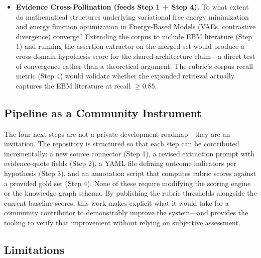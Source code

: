 \documentclass[
  english,
]{article}
\begin{document}
\begin{itemize}
  low-dimensional discrete environments). Beyond what state-space
  dimensionality and reward density does the expected-free-energy
  exploration advantage of model-based AIF degrade relative to
  model-free architectures such as SAC or PPO? Answering this requires
  assembling the outcome-indicator-tagged evidence (Step 3) and
  identifying which benchmark comparisons are already in the literature
  versus which are genuinely absent.
\item
  \textbf{Evidence Cross-Pollination (feeds Step 1 + Step 4).} To what
  extent do mathematical structures underlying variational free energy
  minimization and energy function optimization in Energy-Based Models
  (VAEs, contrastive divergence) converge? Extending the corpus to
  include EBM literature (Step 1) and running the assertion extractor on
  the merged set would produce a cross-domain hypothesis score for the
  shared-architecture claim---a direct test of convergence rather than a
  theoretical argument. The rubric's corpus recall metric (Step 4) would
  validate whether the expanded retrieval actually captures the EBM
  literature at recall \(\geq 0.85\).
\end{itemize}

\subsection{Pipeline as a Community
Instrument}\label{pipeline-as-a-community-instrument}

The four next steps are not a private development roadmap---they are an
invitation. The repository is structured so that each step can be
contributed incrementally: a new source connector (Step 1), a revised
extraction prompt with evidence-quote fields (Step 2), a YAML file
defining outcome indicators per hypothesis (Step 3), and an annotation
script that computes rubric scores against a provided gold set (Step 4).
None of these require modifying the scoring engine or the knowledge
graph schema. By publishing the rubric thresholds alongside the current
baseline scores, this work makes explicit what it would take for a
community contributor to demonstrably improve the system---and provides
the tooling to verify that improvement without relying on subjective
assessment.

\subsection{Limitations}\label{limitations-1}
\end{document}
